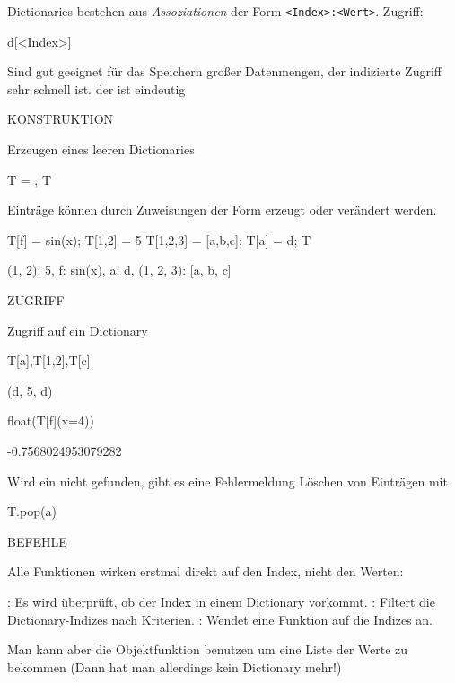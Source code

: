 \documentclass[fontsize=12pt,paper=a4,twoside,bibtotoc,idxtotoc,
liststotoc,pagesize,BCOR1.2cm,DIV15,chapterprefix,pagesize=pdftex]{scrbook}
\theoremstyle{plain}
\theoremstyle{definition}
\theoremstyle{remark}
\begin{document}
 Dictionaries bestehen aus \emph{Assoziationen} der Form \verb+<Index>:<Wert>+. 
 Zugriff:
\begin{sagein}
d[<Index>]
\end{sagein}
  Sind gut geeignet für das Speichern großer Datenmengen, der indizierte Zugriff sehr schnell ist.
 der  ist eindeutig


KONSTRUKTION


 Erzeugen eines leeren Dictionaries
\begin{sagein}
T = {}; T
\end{sagein}
\begin{sage}
  {}
\end{sage}
 Einträge können durch Zuweisungen der Form  erzeugt oder verändert werden. 
\begin{sagein}
T[f] = sin(x); T[1,2] = 5
T[1,2,3] = [a,b,c]; T[a] = d;
T
\end{sagein}
\begin{sage}
{(1, 2): 5, f: sin(x), a: d, (1, 2, 3): [a, b, c]}
\end{sage}


ZUGRIFF


 Zugriff auf ein Dictionary
\begin{sagein}
T[a],T[1,2],T[c]
\end{sagein}
\begin{sage}
(d, 5, d)
\end{sage}
\begin{sagein}
 float(T[f](x=4))
\end{sagein}
\begin{sage}
 -0.7568024953079282
\end{sage}
Wird ein  nicht gefunden, gibt es eine Fehlermeldung
 Löschen von Einträgen mit 
\begin{sagein}
T.pop(a)
\end{sagein}


BEFEHLE

Alle Funktionen wirken erstmal direkt auf den Index, nicht den Werten:

 : Es wird überprüft, ob der Index  in einem
Dictionary vorkommt. 
 : Filtert die Dictionary-Indizes nach Kriterien.
 : Wendet eine Funktion auf die Indizes an.

Man kann aber die Objektfunktion  benutzen um eine Liste der Werte zu bekommen (Dann hat man allerdings kein Dictionary mehr!)
\end{document}
